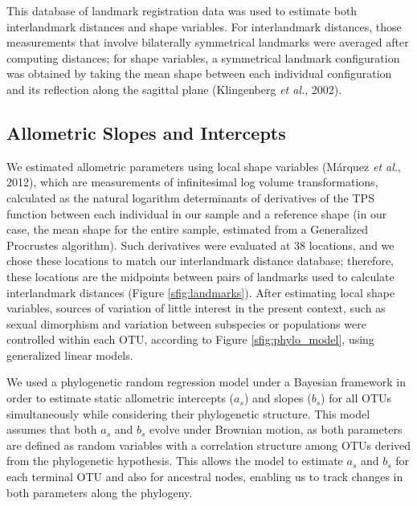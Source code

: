 \documentclass[11pt,twoside]{report}
\begin{document}
This database of landmark registration data was used to estimate both
interlandmark distances and shape variables. For interlandmark
distances, those measurements that involve bilaterally symmetrical
landmarks were averaged after computing distances; for shape variables,
a symmetrical landmark configuration was obtained by taking the mean
shape between each individual configuration and its reflection along the
sagittal plane (Klingenberg \emph{et al.}, 2002).

\subsection{Allometric Slopes and
Intercepts}\label{allometric-slopes-and-intercepts}

We estimated allometric parameters using local shape variables (Márquez
\emph{et al.}, 2012), which are measurements of infinitesimal log volume
transformations, calculated as the natural logarithm determinants of
derivatives of the TPS function between each individual in our sample
and a reference shape (in our case, the mean shape for the entire
sample, estimated from a Generalized Procrustes algorithm). Such
derivatives were evaluated at 38 locations, and we chose these locations
to match our interlandmark distance database; therefore, these locations
are the midpoints between pairs of landmarks used to calculate
interlandmark distances (Figure \ref{sfig:landmarks}). After estimating
local shape variables, sources of variation of little interest in the
present context, such as sexual dimorphism and variation between
subspecies or populations were controlled within each OTU, according to
Figure \ref{sfig:phylo_model}, using generalized linear models.

We used a phylogenetic random regression model under a Bayesian
framework in order to estimate static allometric intercepts ($a_s$) and
slopes ($b_s$) for all OTUs simultaneously while considering their
phylogenetic structure. This model assumes that both $a_s$ and $b_s$
evolve under Brownian motion, as both parameters are defined as random
variables with a correlation structure among OTUs derived from the
phylogenetic hypothesis. This allows the model to estimate $a_s$ and
$b_s$ for each terminal OTU and also for ancestral nodes, enabling us to
track changes in both parameters along the phylogeny.
\end{document}
